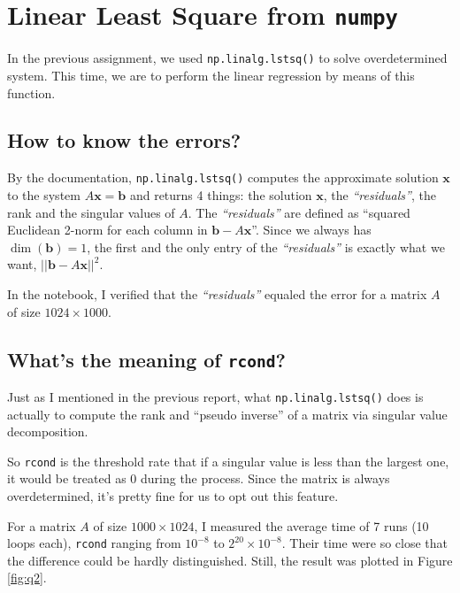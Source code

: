 \documentclass[12pt, a4paper]{article}
\begin{document}
\section{Linear Least Square from \texttt{numpy}}

In the previous assignment, we used \texttt{np.linalg.lstsq()} to solve overdetermined system. This time, we are to perform the linear regression by means of this function.

\subsection{How to know the errors?}

By the documentation, \texttt{np.linalg.lstsq()} computes the approximate solution $\mathbf{x}$ to the system $A\mathbf{x}=\mathbf{b}$ and returns 4 things: the solution $\mathbf{x}$, the \emph{``residuals''}, the rank and the singular values of $A$. The \emph{``residuals''} are defined as ``squared Euclidean 2-norm for each column in $\mathbf{b}-A\mathbf{x}$''. Since we always has $\dim(\mathbf{b})=1$, the first and the only entry of the \emph{``residuals''} is exactly what we want, $||\mathbf{b}-A\mathbf{x}||^2$.

In the notebook, I verified that the \emph{``residuals''} equaled the error for a matrix $A$ of size $1024\times1000$.

\subsection{What's the meaning of \texttt{rcond}?}

Just as I mentioned in the previous report, what \texttt{np.linalg.lstsq()} does is actually to compute the rank and ``pseudo inverse'' of a matrix via singular value decomposition.

So \texttt{rcond} is the threshold rate that if a singular value is less than the largest one, it would be treated as 0 during the process. Since the matrix is always overdetermined, it's pretty fine for us to opt out this feature.

For a matrix $A$ of size $1000\times1024$, I measured the average time of 7 runs (10 loops each), \texttt{rcond} ranging from $10^{-8}$ to $2^{20}\times10^{-8}$. Their time were so close that the difference could be hardly distinguished. Still, the result was plotted in Figure \ref{fig:q2}.
\end{document}
